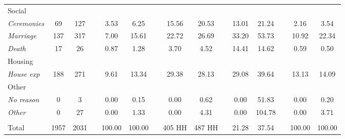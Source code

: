 \begin{table}[htbp]
{\begin{tabular}{lcccccccccccccc}
    Social &   &   &   &   &   &   &   &   &   &   &   &   &   &  \\
    \hspace*{0.2cm} \textit{Ceremonies} & 69 & 127 &   & 3.53 & 6.25 &   & 15.56 & 20.53 &   & 13.01 & 21.24 &   & 2.16 & 3.54 \\
    \hspace*{0.2cm} \textit{Marriage} & 137 & 317 &   & 7.00 & 15.61 &   & 22.72 & 26.69 &   & 33.20 & 53.73 &   & 10.92 & 22.34 \\
    \hspace*{0.2cm} \textit{Death} & 17 & 26 &   & 0.87 & 1.28 &   & 3.70 & 4.52 &   & 14.41 & 14.62 &   & 0.59 & 0.50 \\
    Housing &   &   &   &   &   &   &   &   &   &   &   &   &   &  \\
    \hspace*{0.2cm} \textit{House exp} & 188 & 271 &   & 9.61 & 13.34 &   & 29.38 & 28.13 &   & 29.08 & 39.64 &   & 13.13 & 14.09 \\
    Other &   &   &   &   &   &   &   &   &   &   &   &   &   &  \\
    \hspace*{0.2cm} \textit{No reason} & 0 & 3 &   & 0.00 & 0.15 &   & 0.00 & 0.62 &   & 0.00 & 51.83 &   & 0.00 & 0.20 \\
    \hspace*{0.2cm} \textit{Other} & 0 & 27 &   & 0.00 & 1.33 &   & 0.00 & 4.31 &   & 0.00 & 104.78 &   & 0.00 & 3.71 \\
      &   &   &   &   &   &   &   &   &   &   &   &   &   &  \\
    Total & 1957 & 2031 &   & 100.00 & 100.00 &   & 405 HH & 487 HH &   & 21.28 & 37.54 &   & 100.00 & 100.00 \\
    \bottomrule
    \end{tabular}%
	}
  \label{appendix:purpose}%
\end{table}%
